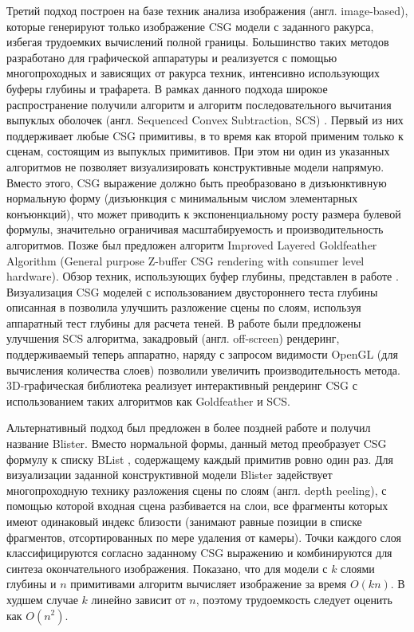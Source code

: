 Третий подход построен на базе техник анализа изображения (англ. image-based), которые генерируют только изображение CSG модели с заданного ракурса, избегая трудоемких вычислений полной границы. Большинство таких методов разработано для графической аппаратуры и реализуется с помощью многопроходных и зависящих от ракурса техник, интенсивно использующих буферы глубины и трафарета. В рамках данного подхода широкое распространение получили алгоритм  и алгоритм последовательного вычитания выпуклых оболочек (англ. Sequenced Convex Subtraction, SCS) \todo{[3]}. Первый из них поддерживает любые CSG примитивы, в то время как второй применим только к сценам, состоящим из выпуклых примитивов. При этом ни один из указанных  алгоритмов не позволяет визуализировать конструктивные модели напрямую. Вместо этого, CSG выражение должно быть преобразовано в дизъюнктивную нормальную форму (дизъюнкция с минимальным числом элементарных конъюнкций), что может приводить к экспоненциальному росту размера булевой формулы, значительно ограничивая  масштабируемость и производительность алгоритмов. Позже был предложен алгоритм Improved Layered Goldfeather Algorithm (General purpose Z-buffer CSG rendering with consumer level hardware). Обзор техник, использующих буфер глубины, представлен в работе \todo{[93]}. Визуализация CSG моделей с использованием двустороннего теста глубины описанная в \todo{[42]} позволила улучшить разложение сцены по слоям, используя аппаратный тест глубины для расчета теней. В работе \todo{[52]} были предложены улучшения SCS алгоритма, закадровый (англ. off-screen) рендеринг, поддерживаемый теперь аппаратно, наряду с запросом видимости OpenGL (для вычисления количества слоев) позволили увеличить производительность метода. 3D-графическая библиотека  реализует интерактивный рендеринг CSG с использованием таких алгоритмов как Goldfeather и SCS. 

Альтернативный подход был предложен в более поздней работе \cmd{[4]} и получил название Blister. Вместо нормальной формы, данный метод преобразует CSG формулу к списку BList \todo{[5]}, содержащему каждый примитив ровно один раз. Для визуализации заданной конструктивной модели Blister задействует многопроходную технику разложения сцены по слоям (англ. depth peeling), с помощью которой входная сцена разбивается на слои, все фрагменты которых имеют одинаковый индекс близости (занимают равные позиции в списке фрагментов, отсортированных по мере удаления от камеры). Точки каждого слоя классифицируются согласно заданному CSG выражению и комбинируются для синтеза окончательного изображения. Показано, что для модели с $k$ слоями глубины и $n$ примитивами алгоритм вычисляет изображение за время $O(kn)$. В худшем случае $k$ линейно зависит от $n$, поэтому трудоемкость следует оценить как $O(n^2)$.

